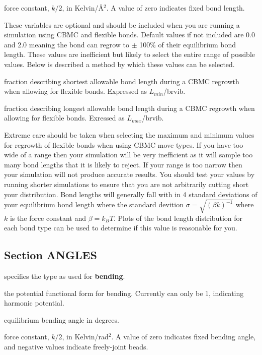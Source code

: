 \documentclass[12pt,letterpaper]{article}
\begin{document}
 force constant, $k/2$, in
Kelvin/\AA$^2$. A value of zero indicates fixed bond length.

 These variables are optional and should be included when 
you are running a simulation using CBMC and flexible bonds.
Default values if not included are 0.0 and 2.0 meaning the 
bond can regrow to $\pm$ 100\% of their equilibrium bond
length. These values are inefficient but likely to select
the entire range of possible values. Below is described
a method by which these values can be selected. 
 
 fraction describing shortest 
allowable bond length during a CBMC regrowth when allowing 
for flexible bonds. Expressed as $L_{min}$/brvib.

 fraction describing longest 
allowable bond length during a CBMC regrowth when allowing 
for flexible bonds. Exressed as $L_{max}$/brvib.

Extreme care should be taken when selecting the maximum and 
minimum values for regrowth of flexible bonds when using CBMC 
move types. If you have too wide of a range then your simulation
will be very inefficient as it will sample too many bond lengths 
that it is likely to reject. If your range is too narrow then 
your simulation will not produce accurate results. You should 
test your values by running shorter simulations to ensure that
you are not arbitrarily cutting short your distribution. Bond
lengths will generally fall with in 4 standard deviations of 
your equilibrium bond length where the standard devition
$\sigma=\sqrt{(\beta k)^{-1}}$ where $k$ is the force constant
and $\beta=k_B T$. Plots of the bond length distribution for 
each bond type can be used to determine if this value is 
reasonable for you.  

\subsection{Section \textbf{ANGLES}}
\label{angles}
 specifies the type as used for {\bf
  bending}.

 the potential functional form for
bending. Currently can only be 1, indicating harmonic
potential.

 equilibrium bending angle in degrees.

 force constant, $k/2$, in
Kelvin/rad$^2$. A value of zero indicates fixed bending
angle, and negative values indicate freely-joint beads.
\end{document}
